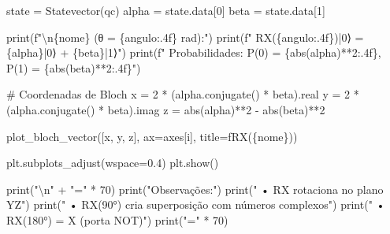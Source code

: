 \documentclass[
  brazilian,
]{report}
\newenvironment{Shaded}{\begin{snugshade}}{\end{snugshade}}
\newcommand{\BuiltInTok}[1]{\textcolor[rgb]{0.00,0.23,0.31}{#1}}
\newcommand{\CharTok}[1]{\textcolor[rgb]{0.13,0.47,0.30}{#1}}
\newcommand{\CommentTok}[1]{\textcolor[rgb]{0.37,0.37,0.37}{#1}}
\newcommand{\DecValTok}[1]{\textcolor[rgb]{0.68,0.00,0.00}{#1}}
\newcommand{\FloatTok}[1]{\textcolor[rgb]{0.68,0.00,0.00}{#1}}
\newcommand{\NormalTok}[1]{\textcolor[rgb]{0.00,0.23,0.31}{#1}}
\newcommand{\OperatorTok}[1]{\textcolor[rgb]{0.37,0.37,0.37}{#1}}
\newcommand{\SpecialCharTok}[1]{\textcolor[rgb]{0.37,0.37,0.37}{#1}}
\newcommand{\SpecialStringTok}[1]{\textcolor[rgb]{0.13,0.47,0.30}{#1}}
\newcommand{\StringTok}[1]{\textcolor[rgb]{0.13,0.47,0.30}{#1}}
\begin{document}
\begin{tcolorbox}
\begin{Shaded}
\begin{Highlighting}[]
\NormalTok{    state }\OperatorTok{=}\NormalTok{ Statevector(qc)}
\NormalTok{    alpha }\OperatorTok{=}\NormalTok{ state.data[}\DecValTok{0}\NormalTok{]}
\NormalTok{    beta }\OperatorTok{=}\NormalTok{ state.data[}\DecValTok{1}\NormalTok{]}
    
    \BuiltInTok{print}\NormalTok{(}\SpecialStringTok{f"}\CharTok{\textbackslash{}n}\SpecialCharTok{\{}\NormalTok{nome}\SpecialCharTok{\}}\SpecialStringTok{ (θ = }\SpecialCharTok{\{}\NormalTok{angulo}\SpecialCharTok{:.4f\}}\SpecialStringTok{ rad):"}\NormalTok{)}
    \BuiltInTok{print}\NormalTok{(}\SpecialStringTok{f"  RX(}\SpecialCharTok{\{}\NormalTok{angulo}\SpecialCharTok{:.4f\}}\SpecialStringTok{)|0⟩ = }\SpecialCharTok{\{}\NormalTok{alpha}\SpecialCharTok{\}}\SpecialStringTok{|0⟩ + }\SpecialCharTok{\{}\NormalTok{beta}\SpecialCharTok{\}}\SpecialStringTok{|1⟩"}\NormalTok{)}
    \BuiltInTok{print}\NormalTok{(}\SpecialStringTok{f"  Probabilidades: P(0) = }\SpecialCharTok{\{}\BuiltInTok{abs}\NormalTok{(alpha)}\OperatorTok{**}\DecValTok{2}\SpecialCharTok{:.4f\}}\SpecialStringTok{, P(1) = }\SpecialCharTok{\{}\BuiltInTok{abs}\NormalTok{(beta)}\OperatorTok{**}\DecValTok{2}\SpecialCharTok{:.4f\}}\SpecialStringTok{"}\NormalTok{)}
    
    \CommentTok{\# Coordenadas de Bloch}
\NormalTok{    x }\OperatorTok{=} \DecValTok{2} \OperatorTok{*}\NormalTok{ (alpha.conjugate() }\OperatorTok{*}\NormalTok{ beta).real}
\NormalTok{    y }\OperatorTok{=} \DecValTok{2} \OperatorTok{*}\NormalTok{ (alpha.conjugate() }\OperatorTok{*}\NormalTok{ beta).imag}
\NormalTok{    z }\OperatorTok{=} \BuiltInTok{abs}\NormalTok{(alpha)}\OperatorTok{**}\DecValTok{2} \OperatorTok{{-}} \BuiltInTok{abs}\NormalTok{(beta)}\OperatorTok{**}\DecValTok{2}
    
\NormalTok{    plot\_bloch\_vector([x, y, z], ax}\OperatorTok{=}\NormalTok{axes[i], title}\OperatorTok{=}\SpecialStringTok{f\textquotesingle{}RX(}\SpecialCharTok{\{}\NormalTok{nome}\SpecialCharTok{\}}\SpecialStringTok{)\textquotesingle{}}\NormalTok{)}

\NormalTok{plt.subplots\_adjust(wspace}\OperatorTok{=}\FloatTok{0.4}\NormalTok{)}
\NormalTok{plt.show()}

\BuiltInTok{print}\NormalTok{(}\StringTok{"}\CharTok{\textbackslash{}n}\StringTok{"} \OperatorTok{+} \StringTok{"="} \OperatorTok{*} \DecValTok{70}\NormalTok{)}
\BuiltInTok{print}\NormalTok{(}\StringTok{"Observações:"}\NormalTok{)}
\BuiltInTok{print}\NormalTok{(}\StringTok{"  • RX rotaciona no plano YZ"}\NormalTok{)}
\BuiltInTok{print}\NormalTok{(}\StringTok{"  • RX(90°) cria superposição com números complexos"}\NormalTok{)}
\BuiltInTok{print}\NormalTok{(}\StringTok{"  • RX(180°) = X (porta NOT)"}\NormalTok{)}
\BuiltInTok{print}\NormalTok{(}\StringTok{"="} \OperatorTok{*} \DecValTok{70}\NormalTok{)}
\end{Highlighting}
\end{Shaded}

\end{tcolorbox}
\end{document}
